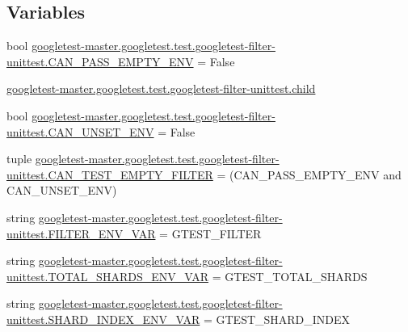 \subsection*{Variables}
\begin{DoxyCompactItemize}
\item 
bool \mbox{\hyperlink{namespacegoogletest-master_1_1googletest_1_1test_1_1googletest-filter-unittest_abf0e52633b951fb0b43defe49b46041c}{googletest-\/master.\+googletest.\+test.\+googletest-\/filter-\/unittest.\+C\+A\+N\+\_\+\+P\+A\+S\+S\+\_\+\+E\+M\+P\+T\+Y\+\_\+\+E\+NV}} = False
\item 
\mbox{\hyperlink{namespacegoogletest-master_1_1googletest_1_1test_1_1googletest-filter-unittest_afbf6a74078649437f6f0bc9b0298d31c}{googletest-\/master.\+googletest.\+test.\+googletest-\/filter-\/unittest.\+child}}
\item 
bool \mbox{\hyperlink{namespacegoogletest-master_1_1googletest_1_1test_1_1googletest-filter-unittest_a0116fa2cffd11bf342cf119cb9689e6c}{googletest-\/master.\+googletest.\+test.\+googletest-\/filter-\/unittest.\+C\+A\+N\+\_\+\+U\+N\+S\+E\+T\+\_\+\+E\+NV}} = False
\item 
tuple \mbox{\hyperlink{namespacegoogletest-master_1_1googletest_1_1test_1_1googletest-filter-unittest_aebad30d6b70749cac0845299384ff4c7}{googletest-\/master.\+googletest.\+test.\+googletest-\/filter-\/unittest.\+C\+A\+N\+\_\+\+T\+E\+S\+T\+\_\+\+E\+M\+P\+T\+Y\+\_\+\+F\+I\+L\+T\+ER}} = (C\+A\+N\+\_\+\+P\+A\+S\+S\+\_\+\+E\+M\+P\+T\+Y\+\_\+\+E\+NV and C\+A\+N\+\_\+\+U\+N\+S\+E\+T\+\_\+\+E\+NV)
\item 
string \mbox{\hyperlink{namespacegoogletest-master_1_1googletest_1_1test_1_1googletest-filter-unittest_a75616f35372c063dce6e648c52ccad6f}{googletest-\/master.\+googletest.\+test.\+googletest-\/filter-\/unittest.\+F\+I\+L\+T\+E\+R\+\_\+\+E\+N\+V\+\_\+\+V\+AR}} = \textquotesingle{}G\+T\+E\+S\+T\+\_\+\+F\+I\+L\+T\+ER\textquotesingle{}
\item 
string \mbox{\hyperlink{namespacegoogletest-master_1_1googletest_1_1test_1_1googletest-filter-unittest_a987bf0f4ff61bc780d8c7f206dac52ff}{googletest-\/master.\+googletest.\+test.\+googletest-\/filter-\/unittest.\+T\+O\+T\+A\+L\+\_\+\+S\+H\+A\+R\+D\+S\+\_\+\+E\+N\+V\+\_\+\+V\+AR}} = \textquotesingle{}G\+T\+E\+S\+T\+\_\+\+T\+O\+T\+A\+L\+\_\+\+S\+H\+A\+R\+DS\textquotesingle{}
\item 
string \mbox{\hyperlink{namespacegoogletest-master_1_1googletest_1_1test_1_1googletest-filter-unittest_a684e9e3aa56786e4901975c6e6283f86}{googletest-\/master.\+googletest.\+test.\+googletest-\/filter-\/unittest.\+S\+H\+A\+R\+D\+\_\+\+I\+N\+D\+E\+X\+\_\+\+E\+N\+V\+\_\+\+V\+AR}} = \textquotesingle{}G\+T\+E\+S\+T\+\_\+\+S\+H\+A\+R\+D\+\_\+\+I\+N\+D\+EX\textquotesingle{}

\end{DoxyCompactItemize}
